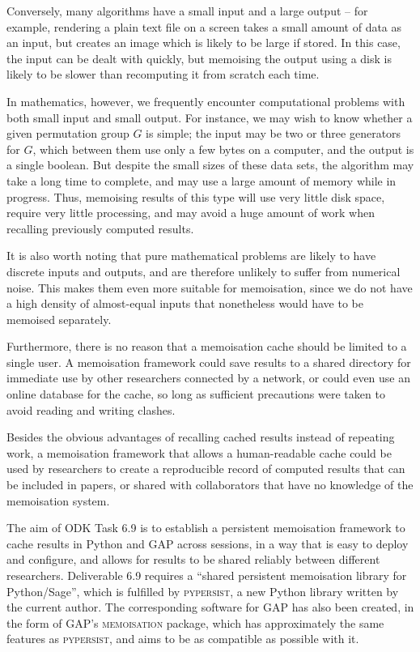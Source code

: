 \documentclass{deliverablereport}
\newcommand{\pypersist}{\textsc{pypersist}}
\newcommand{\Memoisation}{\textsc{memoisation}}
\begin{document}
Conversely, many algorithms have a small input and a large output -- for
example, rendering a plain text file on a screen takes a small amount of data as
an input, but creates an image which is likely to be large if stored.  In this
case, the input can be dealt with quickly, but memoising the output using a disk
is likely to be slower than recomputing it from scratch each time.

In mathematics, however, we frequently encounter computational problems with
both small input and small output.  For instance, we may wish to know whether a
given permutation group $G$ is simple; the input may be two or three generators
for $G$, which between them use only a few bytes on a computer, and the output
is a single boolean.  But despite the small sizes of these data sets, the
algorithm may take a long time to complete, and may use a large amount of memory
while in progress.  Thus, memoising results of this type will use very little
disk space, require very little processing, and may avoid a huge amount of work
when recalling previously computed results.

It is also worth noting that pure mathematical problems are likely to have
discrete inputs and outputs, and are therefore unlikely to suffer from numerical
noise.  This makes them even more suitable for memoisation, since we do not have
a high density of almost-equal inputs that nonetheless would have to be memoised
separately.

Furthermore, there is no reason that a memoisation cache should be limited to a
single user.  A memoisation framework could save results to a shared directory
for immediate use by other researchers connected by a network, or could even
use an online database for the cache, so long as sufficient precautions were
taken to avoid reading and writing clashes.

Besides the obvious advantages of recalling cached results instead of repeating
work, a memoisation framework that allows a human-readable cache could be used
by researchers to create a reproducible record of computed results that can be
included in papers, or shared with collaborators that have no knowledge of the
memoisation system.

The aim of ODK Task 6.9 is to establish a persistent memoisation framework to
cache results in Python and GAP across sessions, in a way that is easy to deploy
and configure, and allows for results to be shared reliably between different
researchers.  Deliverable 6.9 requires a ``shared persistent memoisation library
for Python/Sage'', which is fulfilled by \pypersist{}, a new Python library
written by the current author.  The corresponding software for GAP has also been
created, in the form of GAP's \Memoisation{} package, which has
approximately the same features as \pypersist{}, and aims to be as compatible as
possible with it.
\end{document}
